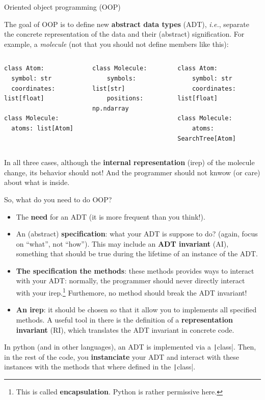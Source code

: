 \documentclass[10pt,
aspectratio=169
]{beamer}
\begin{document}
 \begin{frame}[fragile]{Oriented object programming (OOP)}
 	
 	The goal of OOP is to define new \textbf{abstract data types} (ADT), \textit{i.e.}, separate the concrete representation of the data and their (abstract) signification. For example, a \textit{molecule} (not that you should not define members like this):\begin{columns}
 		\begin{verbatim}
class Atom:
  symbol: str
  coordinates: list[float]
 	
class Molecule:
  atoms: list[Atom]
 		\end{verbatim}
 		\begin{verbatim}
class Molecule:
	symbols: list[str]
	positions: np.ndarray
 		\end{verbatim}
\begin{verbatim}
class Atom:
	symbol: str
	coordinates: list[float]

class Molecule:
	atoms: SearchTree[Atom]
\end{verbatim}
 	\end{columns}
In all three cases, although the \textbf{internal representation} (irep) of the molecule change, its behavior should not! And the programmer should not knwow  (or care) about what is inside.
 \end{frame}
 
\begin{frame}
	So, what do you need to do OOP?\begin{itemize}
		\item The \textbf{need} for an ADT (it is more frequent than you think!).
		\item An (abstract) \textbf{specification}: what your ADT is suppose to do? (again, focus on ``what'', not ``how''). This may include an \textbf{ADT invariant} (AI), something that should be true during the lifetime of an instance of the ADT.
		\item \textbf{The specification the methods}: these methods provides ways to interact with your ADT: normally, the programmer should never directly interact with your irep.\footnote{This is called \textbf{encapsulation}. Python is rather permissive here.} Furthemore,  no method should break the ADT invariant! 
		\item \textbf{An irep}: it should be chosen so that it allow you to  implements all specified methods. A useful tool in there is the definition of a \textbf{representation invariant} (RI), which translates the ADT invariant in concrete code. 
	\end{itemize}
	In python (and in other languages), an ADT is implemented via a \texttt|class|. Then, in the rest of the code, you \textbf{instanciate} your ADT and interact with these instances with the methods that where defined in the \texttt|class|.
	\vspace{1em}
\end{frame}
\end{document}
